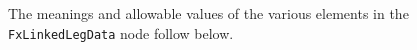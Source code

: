 
The meanings and allowable values of the various elements in the \lstinline!FxLinkedLegData!  node follow below. 

